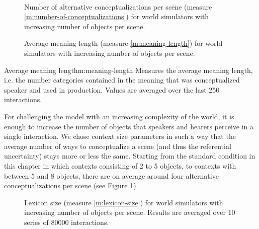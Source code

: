 ~\\

\startfiguregroup

\begin{figure}[t]
  \caption{Number of alternative conceptualizations per scene (measure
    \ref{m:number-of-conceptualizations}) for world simulators with
    increasing number of objects per scene.}
  \label{f:sgg-mw-structured-best-best-context-size-vs-number-of-conceptualizations}
\end{figure}

\begin{figure}[t]
  \caption{Average meaning length (measure \ref{m:meaning-length}) for
    world simulators with increasing number of objects per scene.}
  \label{f:sgg-mw-structured-context-size-vs-meaning-length}
\end{figure}

\stopfiguregroup

\begin{measure}[b]{Average meaning length}{m:meaning-length}
  Measures the average meaning length, i.e. the number categories
  contained in the meaning that was conceptualized speaker and used in
  production. Values are averaged over the last 250 interactions.
\end{measure}


For challenging the model with an increasing complexity of the world,
it is enough to increase the number of objects that speakers and
hearers perceive in a single interaction. We chose context size
parameters in such a way that the average number of ways to
conceptualize a scene (and thus the referential uncertainty) stays
more or less the same. Starting from the standard condition in this
chapter in which contexts consisting of 2 to 5 objects, to contexts
with between 5 and 8 objects, there are on average around four
alternative conceptualizations per scene (see Figure
\ref{f:sgg-mw-structured-best-best-context-size-vs-number-of-conceptualizations}).

\startfiguregroup

\begin{figure}[p]
  \caption{Lexicon size (measure \ref{m:lexicon-size}) for world
    simulators with increasing number of objects per scene. Results
    are averaged over 10 series of 80000 interactions. }
  \label{f:sgg-mw-structured-best-best-context-size-vs-lexicon-size}
\end{figure}


